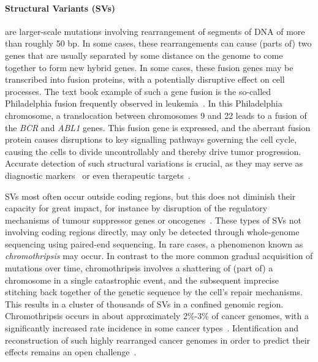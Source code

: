 \begin{justify}
\paragraph{Structural Variants (SVs)} are larger-scale mutations involving rearrangement of segments of DNA of more than roughly 50 bp. In some cases, these rearrangements can cause (parts of) two genes that are usually separated by some distance on the genome to come together to form new hybrid genes. In some cases, these fusion genes may be transcribed into fusion proteins, with a potentially disruptive effect on cell processes. The text book example of such a gene fusion is the so-called Philadelphia fusion frequently observed in leukemia~\cite{de1982cellular,heisterkamp1990acute}. In this Philadelphia chromosome, a translocation between chromosomes 9 and 22 leads to a fusion of the \emph{BCR} and \emph{ABL1} genes. This fusion gene is expressed, and the aberrant fusion protein causes disruptions to key signalling pathways governing the cell cycle, causing the cells to divide uncontrollably and thereby drive tumor progression. Accurate detection of such structural variations is crucial, as they may serve as diagnostic markers~\cite{nowell1960chromosome,nowell1961chromosome} or even therapeutic targets~\cite{druker2001activity,druker2001efficacy}.

SVs most often occur outside coding regions, but this does not diminish their capacity for great impact, for instance by disruption of the regulatory mechanisms of tumour suppressor genes or oncogenes~\cite{yi2018patterns}. These types of SVs not involving coding regions directly, may only be detected through whole-genome sequencing using paired-end sequencing. In rare cases, a phenomenon known as \emph{chromothripsis} may occur. In contrast to the more common gradual acquisition of mutations over time, chromothripsis involves a shattering of (part of) a chromosome in a single catastrophic event, and the subsequent imprecise stitching back together of the genetic sequence by the cell's repair mechanisms. This results in a cluster of thousands of SVs in a confined genomic region. Chromothripsis occurs in about approximately 2\%-3\% of cancer genomes, with a significantly increased rate incidence in some cancer types~\cite{luijten2018}. Identification and reconstruction of such highly rearranged cancer genomes in order to predict their effects remains an open challenge~\cite{yang2016chromothripsis,govind2014}.





\end{justify}

